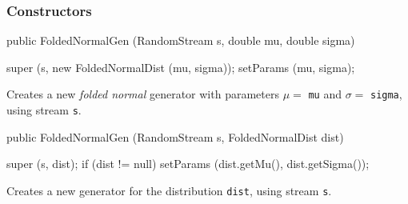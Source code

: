 \subsubsection* {Constructors}
\begin{code}

   public FoldedNormalGen (RandomStream s, double mu, double sigma) \begin{hide} {
      super (s, new FoldedNormalDist (mu, sigma));
      setParams (mu, sigma);
   }\end{hide}
\end{code}
  \begin{tabb}  Creates a new {\em folded normal} generator with parameters $\mu =$ 
     \texttt{mu} and $\sigma =$ \texttt{sigma}, using stream \texttt{s}.
\end{tabb}
\begin{code}

   public FoldedNormalGen (RandomStream s, FoldedNormalDist dist) \begin{hide} {
      super (s, dist);
      if (dist != null)
         setParams (dist.getMu(), dist.getSigma());
   }\end{hide}
\end{code}
\begin{tabb} Creates a new generator for the distribution \texttt{dist},
     using stream \texttt{s}.
\end{tabb}


